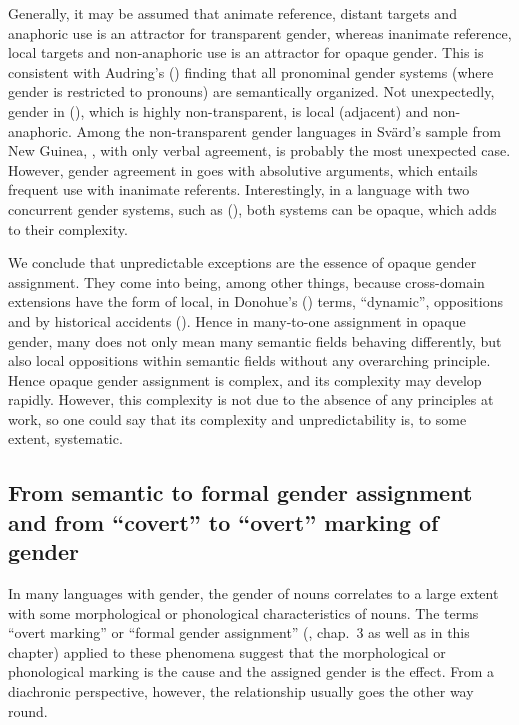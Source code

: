\documentclass[output=collectionpaper]{langsci/langscibook}
\begin{document}
Generally, it may be assumed that animate reference, distant targets and anaphoric use is an attractor for transparent gender, whereas inanimate reference, local targets and non-anaphoric use is an attractor for opaque gender. This is consistent with Audring's (\citealt*{Audring2009a}) finding that all pronominal gender systems (where gender is restricted to pronouns) are semantically organized. Not unexpectedly, gender in  (), which is highly non-transparent, is local (adjacent) and non-anaphoric. Among the non-transparent gender languages in Svärd's sample from New Guinea, , with only verbal agreement, is probably the most unexpected case. However, gender agreement in  goes with absolutive arguments, which entails frequent use with inanimate referents. Interestingly, in a language with two concurrent gender systems, such as  (\citealt{Aikhenvald2010}), both systems can be opaque, which adds to their complexity.

We conclude that unpredictable exceptions are the essence of opaque gender assignment. They come into being, among other things, because cross-domain extensions have the form of local, in Donohue's (\citealt*{Donohue2004}) terms, ``dynamic'', oppositions and by historical accidents (\citealt*{Seifart2018}). Hence in many-to-one assignment in opaque gender, many does not only mean many semantic fields behaving differently, but also local oppositions within semantic fields without any overarching principle. Hence opaque gender assignment is complex, and its complexity may develop rapidly. However, this complexity is not due to the absence of any principles at work, so one could say that its complexity and unpredictability is, to some extent, systematic.

  \subsection{From semantic to formal gender assignment and from ``covert'' to ``overt'' marking of gender}
\label{sec:WDG:6.4}

In many languages with gender, the gender of nouns correlates to a large extent with some morphological or phonological characteristics of nouns. The terms ``overt marking'' or ``formal gender assignment'' (\citealt{Corbett1991}, chap.~3 as well as  in this chapter) applied to these phenomena suggest that the morphological or phonological marking is the cause and the assigned gender is the effect. From a diachronic perspective, however, the relationship usually goes the other way round.
\end{document}
